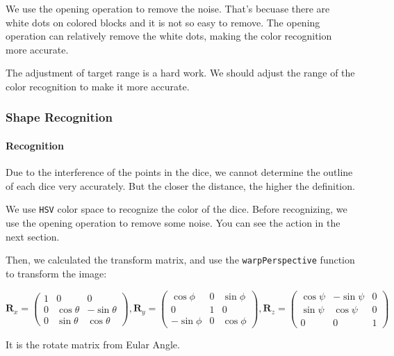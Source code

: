 \documentclass{article}
\begin{document}
We use the opening operation to remove the noise. That's becuase there are white dots on colored blocks and it is not so easy to remove. The opening operation can relatively remove the white dots, making the color recognition more accurate.

The adjustment of target range is a hard work. We should adjust the range of the color recognition to make it more accurate.

\subsubsection{Shape Recognition}

\paragraph{Recognition}

Due to the interference of the points in the dice, we cannot determine the outline of each dice very accurately. But the closer the distance, the higher the definition.

We use \texttt{HSV} color space to recognize the color of the dice. Before recognizing, we use the opening operation to remove some noise. You can see the action in the next section.

Then, we calculated the transform matrix, and use the \texttt{warpPerspective} function to transform the image:

\begin{equation}
  \boldsymbol{R}_x=
  \left(
  \begin{matrix}
    1 & 0 & 0 \\
    0 & \cos\theta & -\sin\theta \\
    0 & \sin\theta & \cos\theta
  \end{matrix}
  \right),
  \boldsymbol{R}_y=
  \left(
  \begin{matrix}
    \cos\phi & 0 & \sin\phi \\
    0 & 1 & 0 \\
    -\sin\phi & 0 & \cos\phi
  \end{matrix}
  \right),
  \boldsymbol{R}_z=
  \left(
  \begin{matrix}
    \cos\psi & -\sin\psi & 0 \\
    \sin\psi & \cos\psi & 0 \\
    0 & 0 & 1
  \end{matrix}
  \right)
\end{equation}

It is the rotate matrix from Eular Angle.
\end{document}
